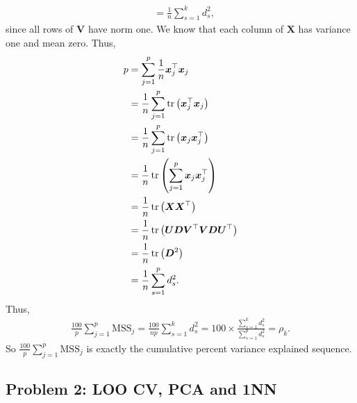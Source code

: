 \begin{enumerate}[label=(\alph*)]
\begin{align*}
        &=\frac{1}{n}\sum_{s=1}^k d_s^2,
    \end{align*}
    since all rows of $\bm{V}$ have norm one. We know that each column of $\bm{X}$ has variance one and mean zero. Thus,
    \begin{align*}
        p&=\sum_{j=1}^p \frac{1}{n} \bm{x}_j^\top \bm{x}_j\\
        &=\frac{1}{n}\sum_{j=1}^p \operatorname{tr}\left(\bm{x}_j^\top \bm{x}_j\right)\\
        &=\frac{1}{n}\sum_{j=1}^p \operatorname{tr}\left(\bm{x}_j\bm{x}_j^\top \right)\\
        &=\frac{1}{n}\operatorname{tr}\left(\sum_{j=1}^p \bm{x}_j\bm{x}_j^\top \right)\\
        &=\frac{1}{n}\operatorname{tr}\left(\bm{X}\bm{X}^\top\right)\\
        &=\frac{1}{n}\operatorname{tr}\left(\bm{U}\bm{D}\bm{V}^\top \bm{V}\bm{D}\bm{U}^\top\right)\\
        &=\frac{1}{n}\operatorname{tr}\left(\bm{D}^2\right)\\
        &=\frac{1}{n}\sum_{s=1}^p d_s^2.
    \end{align*}
    Thus,
    \begin{align*}
        \frac{100}{p}\sum_{j=1}^p \mathrm{MSS}_j =\frac{100}{np} \sum_{s=1}^k d_s^2=100 \times \frac{\sum_{s=1}^k d_s^2}{\sum_{s=1}^p d_s^2} =\rho_k.
    \end{align*}
    So $\frac{100}{p}\sum_{j=1}^p \mathrm{MSS}_j$ is exactly the cumulative percent variance explained sequence.
\end{enumerate}

\subsection*{Problem 2: LOO CV, PCA and 1NN}

